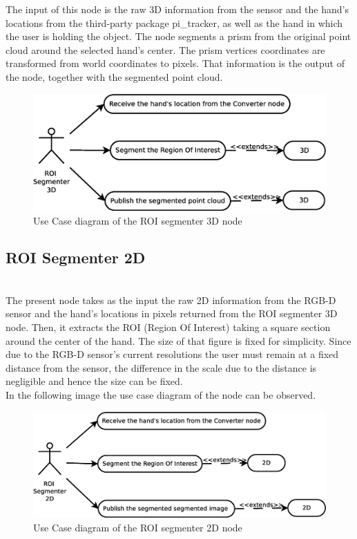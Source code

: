 	The input of this node is the raw 3D information from the sensor and the hand's locations from the third-party package pi\_tracker, as well as the hand in which the user is holding the object. The node segments a prism from the original point cloud around the selected hand's center. The prism vertices coordinates are transformed from world coordinates to pixels. That information is the output of the node, together with the segmented point cloud. 

	\begin{figure}[H]
		\centering
	\includegraphics[scale=0.4]{img/diagrams/uc_roi_segmenter_3d.eps}
		\caption[Use case diagram ROI segmenter 3D node]{Use Case diagram of the ROI segmenter 3D node}
		
	\end{figure}
 
\subsection{ROI Segmenter 2D}\\
	\label{roi_segmenter_2d}
	The present node takes as the input the raw 2D information from the RGB-D sensor and the hand's locations in pixels returned from the ROI segmenter 3D node. Then, it extracts the ROI (Region Of Interest) taking a square section around the center of the hand. The size of that figure is fixed for simplicity. Since due to the RGB-D sensor's current resolutions the user must remain at a fixed distance from the sensor, the difference in the scale due to the distance is negligible and hence the size can be fixed. 
	\\

	In the following image the use case diagram of the node can be observed.
	\begin{figure}[H]
		\centering
			\includegraphics[scale=0.4]{img/diagrams/uc_roi_segmenter_2d.eps}
			\caption[Use case diagram ROI segmenter 2D node]{Use Case diagram of the ROI segmenter 2D node}
		
	\end{figure}


